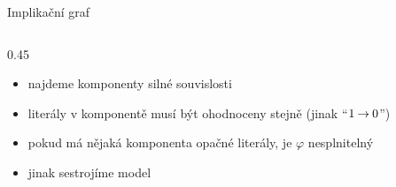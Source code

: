 \documentclass{beamer}
\begin{document}
\begin{frame}{Implikační graf}
\begin{columns}
        \begin{column}{0.45\textwidth}
        
        \begin{itemize}[<+->]
            \item najdeme komponenty silné souvislosti
            \item literály v komponentě musí být ohodnoceny stejně (jinak ``$1\mathbin{\rightarrow} 0$'')
            \item pokud má nějaká komponenta opačné literály, je $\varphi$ nesplnitelný
            \item jinak sestrojíme model
        \end{itemize}
        
        \end{column}
         
    \end{columns}

\end{frame}
\end{document}
